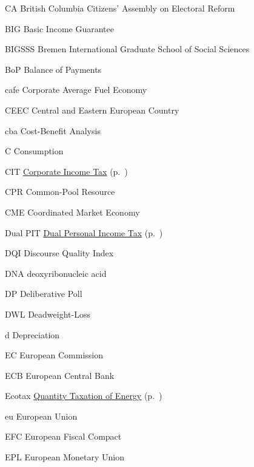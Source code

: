 	{CA}
	{British Columbia Citizens' Assembly on Electoral Reform}

	{BIG}
	{Basic Income Guarantee}

	{BIGSSS}
	{Bremen International Graduate School of Social Sciences}

	{BoP}
	{Balance of Payments}

	{cafe}
	{Corporate Average Fuel Economy}

	{CEEC}
	{Central and Eastern European Country}

	{cba}
	{Cost-Benefit Analysis}

	{C}
	{Consumption}

	{CIT}
	{\hyperref[sec:CIT]{Corporate Income Tax} (p.~\pageref{sec:CIT})}

	{CPR}
	{Common-Pool Resource}

	{CME}
	{Coordinated Market Economy}

	{Dual PIT}
	{\hyperref[sec:Dual-PIT]{Dual Personal Income Tax} (p.~\pageref{sec:Dual-PIT})}

	{DQI}
	{Discourse Quality Index}

	{DNA}
	{deoxyribonucleic acid}

	{DP\textregistered}
	{Deliberative Poll \textregistered}

	{DWL}
	{Deadweight-Loss}

	{d}
	{Depreciation}

	{EC}
	{European Commission}

	{ECB}
	{European Central Bank}

	{Ecotax}
	{\hyperref[sec:Ecotax]{Quantity Taxation of Energy} (p.~\pageref{sec:Ecotax})}

	{eu}
	{European Union}

	{EFC}
	{European Fiscal Compact}

	{EPL}
	{European Monetary Union}


